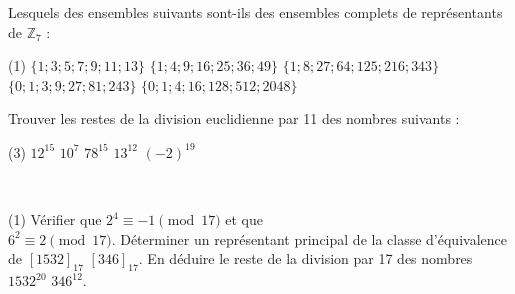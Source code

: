 \begin{exstheorie}
	
	\vspace*{0.5cm}
	
	\exo
	Lesquels des ensembles suivants sont-ils des ensembles complets de représentants  de $\mathbb{Z}_7$ :

	\begin{tasks}[label=\alph*),item-indent=8mm,column-sep=0mm ,after-item-skip=1mm,label-offset=2mm,label-align=right](1)
		\task $\{1 ; 3 ; 5 ; 7 ; 9 ; 11 ; 13\}$
		\task $\{1 ; 4 ; 9 ; 16 ; 25 ; 36 ; 49\}$
		\task $\{1;8;27;64;125;216;343\}$
		\task $\{0 ; 1 ; 3 ; 9 ; 27 ; 81 ; 243\}$
		\task $\{0;1;4;16;128;512;2048\}$
	\end{tasks}
	
	\eexo
	
	\pagebreak[1]
	
	\exo
%	
	Trouver les restes de la division euclidienne par 11 des nombres suivants :
	\begin{tasks}[label=\alph*),item-indent=6mm,column-sep=0mm ,after-item-skip=5mm,label-offset=2mm,label-align=right](3)
		\task $12^{15}$
		\task $10^7$
		\task $78^{15}$
		\task $13^{12}$
		\task $(-2)^{19}$
	\end{tasks}
	
	\eexo

	\pagebreak[1]
	

	\exo
	~
	
	\vspace{-6mm}
	\begin{tasks}[label=\alph*),item-indent=6mm,column-sep=0mm ,after-item-skip=3mm,label-offset=2mm,label-align=right](1)
		\task Vérifier que $2^4 \equiv -1 \pmod{17}$ et que \\ $6^2 \equiv 2 \pmod{17}$.
		\task Déterminer un représentant principal de la classe d'équivalence de $\left[1532\right]_{17}$  $\left[346\right]_{17}$.
		\task En déduire le reste de la division par 17 des nombres $1532^{20}$  $346^{12}$.
	\end{tasks}
	
	
	
	
	
	\eexo
	\pagebreak[1]
	
	\columnbreak
	
	
%	
%	
%	
%	
%	
%	
	

\end{exstheorie}
